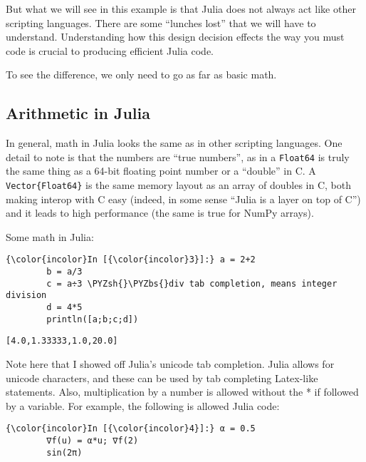 \documentclass[11pt]{article}
\def\PYZbs{\char`\\}
\def\PYZsh{\char`\#}
\begin{document}
But what we will see in this example is that Julia does not always act
like other scripting languages. There are some ``lunches lost'' that we
will have to understand. Understanding how this design decision effects
the way you must code is crucial to producing efficient Julia code.

To see the difference, we only need to go as far as basic math.

    \subsection{Arithmetic in Julia}\label{arithmetic-in-julia}

In general, math in Julia looks the same as in other scripting
languages. One detail to note is that the numbers are ``true numbers'',
as in a \texttt{Float64} is truly the same thing as a 64-bit floating
point number or a ``double'' in C. A \texttt{Vector\{Float64\}} is the
same memory layout as an array of doubles in C, both making interop with
C easy (indeed, in some sense ``Julia is a layer on top of C'') and it
leads to high performance (the same is true for NumPy arrays).

Some math in Julia:

    \begin{Verbatim}[commandchars=\\\{\}]
{\color{incolor}In [{\color{incolor}3}]:} a = 2+2
        b = a/3
        c = a÷3 \PYZsh{}\PYZbs{}div tab completion, means integer division
        d = 4*5
        println([a;b;c;d])
\end{Verbatim}

    \begin{Verbatim}[commandchars=\\\{\}]
[4.0,1.33333,1.0,20.0]

    \end{Verbatim}

    Note here that I showed off Julia's unicode tab completion. Julia allows
for unicode characters, and these can be used by tab completing
Latex-like statements. Also, multiplication by a number is allowed
without the * if followed by a variable. For example, the following is
allowed Julia code:

    \begin{Verbatim}[commandchars=\\\{\}]
{\color{incolor}In [{\color{incolor}4}]:} α = 0.5
        ∇f(u) = α*u; ∇f(2)
        sin(2π)
\end{Verbatim}
\end{document}
